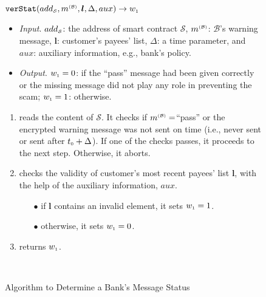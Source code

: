 \begin{figure}[!htbp]
\setlength{\fboxsep}{0.7pt}
\begin{center}
\begin{boxedminipage}{12.3cm}
\small{
\underline{$\mathtt{verStat}(add_{\scriptscriptstyle\mathcal{S}}, m^{\scriptscriptstyle\mathcal{(B)}},  \bm l, \Delta, aux)\rightarrow w_{\scriptscriptstyle 1}$}\\
%
\begin{itemize}
\item\noindent\textit{Input}. $add_{\scriptscriptstyle\mathcal{S}}$: the address of smart contract $\mathcal{S}$, $m^{\scriptscriptstyle\mathcal{(B)}}$:  $\mathcal{B}$'s warning message,  $\bm l$:  customer's payees' list, $\Delta$: a time parameter, and $aux$: auxiliary information, e.g., bank's policy. 
%
\item\noindent\textit{Output}. $ w_{\scriptscriptstyle 1}=0$: if the ``pass'' message had been given correctly or the missing message did not play any role in preventing the scam; $ w_{\scriptscriptstyle 1}=1$: otherwise. 
\end{itemize}
\begin{enumerate}
\item reads the content of   $\mathcal{S}$. It checks if $m^{\scriptscriptstyle\mathcal{(B)}}=$``pass''  or the encrypted warning message was not sent on time (i.e., never sent or sent after    $t_{\scriptscriptstyle 0}+\Delta$).  If one of the checks passes, it proceeds to the next step. Otherwise, it aborts. 
\item checks the validity of  customer's most recent payees' list $\bm l$, with the help of the auxiliary information, $aux$. 
\begin{itemize}
\item[$\bullet$]  if $\bm l$ contains an invalid element,  it sets $ w_{\scriptscriptstyle 1}=1$.
\item [$\bullet$] otherwise, it sets $ w_{\scriptscriptstyle 1}=0$.
\end{itemize}
\item returns $ w_{\scriptscriptstyle 1}$.

\

\end{enumerate}

}
\end{boxedminipage}
\end{center}
\caption{Algorithm to Determine a Bank's Message Status} 
\label{fig:verStat}
\end{figure}
